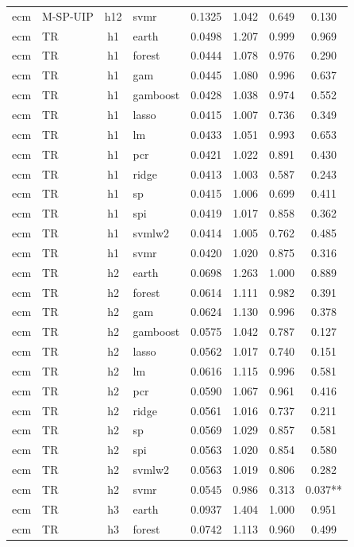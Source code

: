 \begin{ThreePartTable}
\begin{longtable}[t]{llclcccc}
ecm & M-SP-UIP & h12 & svmr & 0.1325 & 1.042 & 0.649 & 0.130\\
\addlinespace
ecm & TR & h1 & earth & 0.0498 & 1.207 & 0.999 & 0.969\\
ecm & TR & h1 & forest & 0.0444 & 1.078 & 0.976 & 0.290\\
ecm & TR & h1 & gam & 0.0445 & 1.080 & 0.996 & 0.637\\
ecm & TR & h1 & gamboost & 0.0428 & 1.038 & 0.974 & 0.552\\
ecm & TR & h1 & lasso & 0.0415 & 1.007 & 0.736 & 0.349\\
ecm & TR & h1 & lm & 0.0433 & 1.051 & 0.993 & 0.653\\
ecm & TR & h1 & pcr & 0.0421 & 1.022 & 0.891 & 0.430\\
ecm & TR & h1 & ridge & 0.0413 & 1.003 & 0.587 & 0.243\\
ecm & TR & h1 & sp & 0.0415 & 1.006 & 0.699 & 0.411\\
ecm & TR & h1 & spi & 0.0419 & 1.017 & 0.858 & 0.362\\
ecm & TR & h1 & svmlw2 & 0.0414 & 1.005 & 0.762 & 0.485\\
ecm & TR & h1 & svmr & 0.0420 & 1.020 & 0.875 & 0.316\\
\addlinespace
ecm & TR & h2 & earth & 0.0698 & 1.263 & 1.000 & 0.889\\
ecm & TR & h2 & forest & 0.0614 & 1.111 & 0.982 & 0.391\\
ecm & TR & h2 & gam & 0.0624 & 1.130 & 0.996 & 0.378\\
ecm & TR & h2 & gamboost & 0.0575 & 1.042 & 0.787 & 0.127\\
ecm & TR & h2 & lasso & 0.0562 & 1.017 & 0.740 & 0.151\\
ecm & TR & h2 & lm & 0.0616 & 1.115 & 0.996 & 0.581\\
ecm & TR & h2 & pcr & 0.0590 & 1.067 & 0.961 & 0.416\\
ecm & TR & h2 & ridge & 0.0561 & 1.016 & 0.737 & 0.211\\
ecm & TR & h2 & sp & 0.0569 & 1.029 & 0.857 & 0.581\\
ecm & TR & h2 & spi & 0.0563 & 1.020 & 0.854 & 0.580\\
ecm & TR & h2 & svmlw2 & 0.0563 & 1.019 & 0.806 & 0.282\\
ecm & TR & h2 & svmr & 0.0545 & 0.986 & 0.313 & 0.037**\\
\addlinespace
ecm & TR & h3 & earth & 0.0937 & 1.404 & 1.000 & 0.951\\
ecm & TR & h3 & forest & 0.0742 & 1.113 & 0.960 & 0.499\\

\end{longtable}
\end{ThreePartTable}
